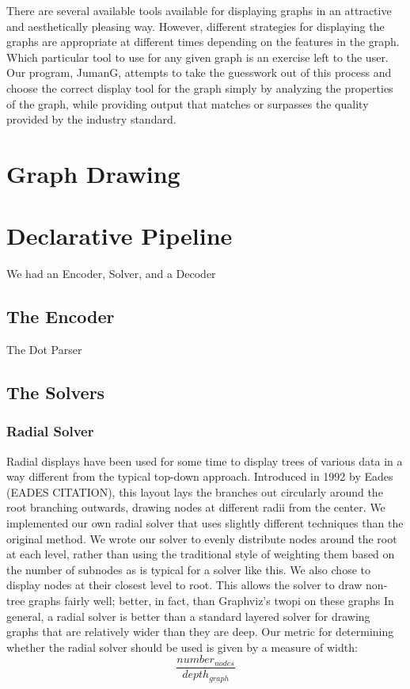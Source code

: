 \documentclass{article}
\begin{document}
There are several available tools available for displaying graphs in an attractive and aesthetically pleasing way. 
However, different strategies for displaying the graphs are appropriate at different times depending on the features in the graph. Which 
particular tool to use for any given graph is an exercise left to the user. Our program, JumanG, attempts to take the guesswork out of 
this process and choose the correct display tool for the graph simply by analyzing the properties of the graph, while providing output that 
matches or surpasses the quality provided by the industry standard.


\section{Graph Drawing}


\section{Declarative Pipeline}

We had an Encoder, Solver, and a Decoder

\subsection{The Encoder}
The Dot Parser

\subsection{The Solvers}

\subsubsection{Radial Solver}
Radial displays have been used for some time to display trees of various data in a way different from the typical top-down approach.
Introduced in 1992 by Eades (EADES CITATION), this layout lays the branches out circularly around the root branching outwards, drawing 
nodes at different radii from the center. We implemented our own radial solver that uses slightly different techniques than the original
method. We wrote our solver to evenly distribute nodes around the root at each level, rather than using the traditional style of weighting 
them based on the number of subnodes as is typical for a solver like this. We also chose to display nodes at their closest level to root. 
This allows the solver to draw non-tree graphs fairly well; better, in fact, than Graphviz's twopi on these graphs 
In general, a radial solver is better than a standard layered solver for drawing graphs that are relatively wider than they are deep. Our metric 
for determining whether the radial solver should be used is given by a measure of width: 
$$\frac{number_{nodes}}{depth_{graph}}$$
\end{document}
